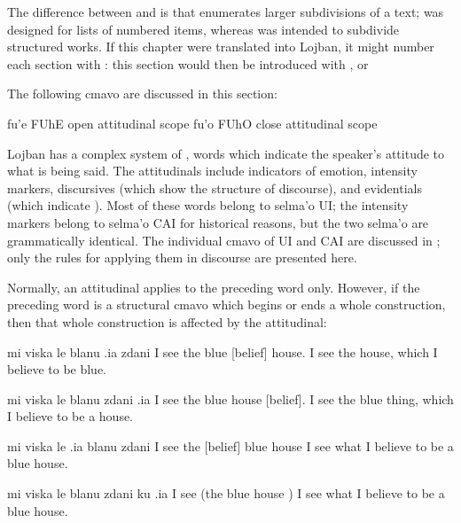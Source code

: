 The difference between  and  is that 
    enumerates larger subdivisions of a text;  was designed
    for lists of numbered items, whereas  was intended to
    subdivide structured works. If this chapter were translated
    into Lojban, it might number each section with : this
    section would then be introduced with , or 



The following cmavo are discussed in this section:

   fu'e    FUhE    open attitudinal scope
    fu'o    FUhO    close attitudinal scope

Lojban has a complex system of , words which
    indicate the speaker's attitude to what is being said. The
    attitudinals include indicators of emotion, intensity markers,
    discursives (which show the structure of discourse), and
    evidentials (which indicate ). Most of
    these words belong to selma'o UI; the intensity markers belong
    to selma'o CAI for historical reasons, but the two selma'o are
    grammatically identical. The individual cmavo of UI and CAI are
    discussed in ; only the
    rules for applying them in discourse are presented here. 

Normally, an attitudinal applies to the preceding word only.
    However, if the preceding word is a structural cmavo which
    begins or ends a whole construction, then that whole
    construction is affected by the attitudinal:
\begin{example}
mi viska le blanu .ia zdani \n
I see the blue [belief] house.\n
I see the house, which I believe to be blue.
\end{example}

\begin{example}
mi viska le blanu zdani .ia \n
I see the blue house [belief].\n
I see the blue thing, which I believe to be a house.
\end{example}

\begin{example}
mi viska le .ia blanu zdani \n
I see the [belief] blue house\n
I see what I believe to be a blue house.
\end{example}

\begin{example}
mi viska le blanu zdani ku .ia\n
I see (the blue house ) \n
I see what I believe to be a blue house.
\end{example}

